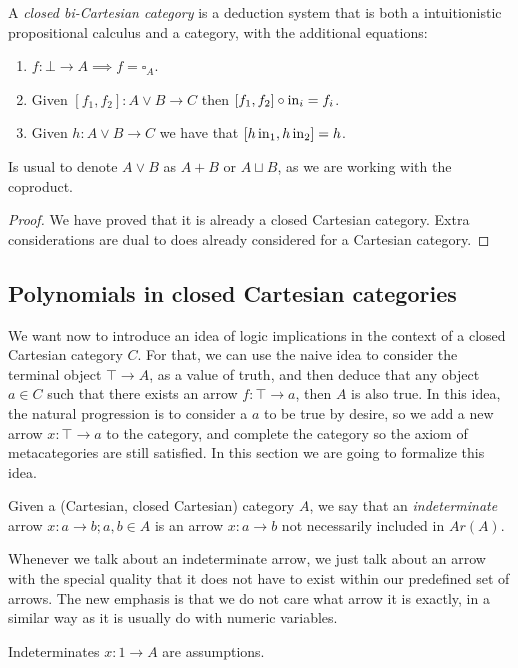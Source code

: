 \begin{proposition} A \emph{closed bi-Cartesian category} is a deduction system that is both a intuitionistic propositional calculus and a category, with the additional equations:
  \begin{enumerate}
  \item $f:\bot \to A \implies f=\square_A$.
  \item Given $[f_1,f_2] : A\lor B \to C$ then $ [f_1,f_2]\circ \operatorname{in}_i  = f_i$.
  \item Given $h:A\lor B\to C$ we have that $[ h\operatorname{in}_1, h\operatorname{in}_2] = h$.
  \end{enumerate}
\end{proposition}
\begin{remark}
  Is usual to denote $A\lor B$ as $A+B$ or $A\sqcup B$, as we are working with the coproduct.
\end{remark} 
\begin{proof}
  We have proved that it is already a closed Cartesian category. Extra considerations are dual to does already considered for a Cartesian category.
\end{proof}
\subsection{Polynomials in closed Cartesian categories}

We want now to introduce an idea of logic implications in the context of a closed Cartesian category $C$. For that, we can use the naive idea to consider the terminal object $\top \to A$, as a value of truth, and then deduce that any object $a\in C$ such that there exists an arrow $f:\top \to a$, then $A$ is also true. In this idea, the natural progression is to consider a $a$ to be true by desire, so we add a new arrow $x:\top \to a$ to the category, and complete the category so the axiom of metacategories are still satisfied. In this section we are going to formalize this idea.
\begin{definition}
  Given a (Cartesian, closed Cartesian) category $A$, we say that an \emph{indeterminate} arrow $x: a \to b; a,b \in A$ is an arrow $x:a \to b$  not necessarily included in $Ar(A)$. 
\end{definition}
\begin{remark}\label{remark-indeterminates}
  Whenever we talk about an indeterminate arrow, we just talk about an arrow with the special quality that it does not have to exist within our predefined set of arrows. The new emphasis is that we do not care what arrow it is exactly, in a similar way as it is usually do with numeric variables. 
\end{remark}
\begin{remark}
  Indeterminates $x: 1\to A$ are assumptions.
\end{remark}

